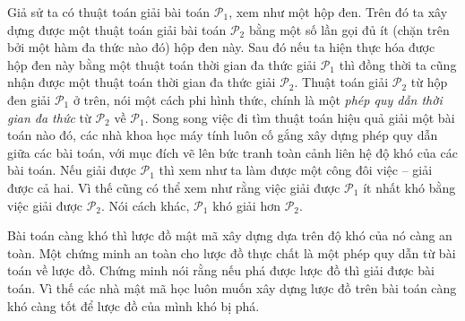 \documentclass[class=report, crop=false]{standalone}
\begin{document}
		Giả sử ta có thuật toán giải bài toán $\mathcal{P}_1$, xem như một hộp đen. Trên đó ta xây dựng được một thuật toán giải bài toán $\mathcal{P}_2$ bằng một số lần gọi đủ ít (chặn trên bởi một hàm đa thức nào đó) hộp đen này. Sau đó nếu ta hiện thực hóa được hộp đen này bằng một thuật toán thời gian đa thức giải $\mathcal{P}_1$ thì đồng thời ta cũng nhận được một thuật toán thời gian đa thức giải $\mathcal{P}_2$. Thuật toán giải $\mathcal{P}_2$ từ hộp đen giải $\mathcal{P}_1$ ở trên, nói một cách phi hình thức, chính là một \textit{phép quy dẫn thời gian đa thức} từ $\mathcal{P}_2$ về $\mathcal{P}_1$. Song song việc đi tìm thuật toán hiệu quả giải một bài toán nào đó, các nhà khoa học máy tính luôn cố gắng xây dựng phép quy dẫn giữa các bài toán, với mục đích vẽ lên bức tranh toàn cảnh liên hệ độ khó của các bài toán. Nếu giải được $\mathcal{P}_1$ thì xem như ta làm được một công đôi việc -- giải được cả hai. Vì thế cũng có thể xem như rằng việc giải được $\mathcal{P}_1$ ít nhất khó bằng việc giải được $\mathcal{P}_2$. Nói cách khác, $\mathcal{P}_1$ khó giải hơn $\mathcal{P}_2$.

		Bài toán càng khó thì lược đồ mật mã xây dựng dựa trên độ khó của nó càng an toàn. Một chứng minh an toàn cho lược đồ thực chất là một phép quy dẫn từ bài toán về lược đồ. Chứng minh nói rằng nếu phá được lược đồ thì giải được bài toán. Vì thế các nhà mật mã học luôn muốn xây dựng lược đồ trên bài toán càng khó càng tốt để lược đồ của mình khó bị phá.
\end{document}
